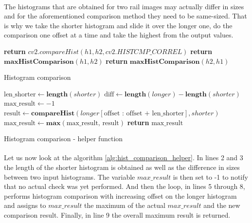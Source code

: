 \paragraph{}
The histograms that are obtained for two rail images may actually differ in sizes and for the aforementioned comparison method they need to be same-sized. That is why we take the shorter histogram and slide it over the longer one, do the comparison one offset at a time and take the highest from the output values.

\begin{algorithm}
	\begin{spacing}{1.5}
	\begin{algorithmic}[1]
				\State \textbf{return} $cv2.compareHist(h1, h2, cv2.HISTCMP\_CORREL)$
				\State \textbf{return} $\textbf{maxHistComparison}(h1, h2)$
			\Else
				\State \textbf{return} $\textbf{maxHistComparison}(h2, h1)$
			\EndIf
		\EndFunction
	\end{algorithmic}
	\end{spacing}
	\caption{Histogram comparison}
	\label{alg:hist_comparison}
\end{algorithm}

\begin{algorithm}
	\begin{spacing}{1.5}
	\begin{algorithmic}[1]
			\State $\text{len\_shorter} \gets \textbf{length}(shorter)$
			\State $\text{diff} \gets \textbf{length}(longer) - \textbf{length}(shorter)$
			\State $\text{max\_result} \gets -1$
				\State $\text{result} \gets \textbf{compareHist}(longer[\text{offset : offset + len\_shorter}], shorter)$
				\State $\text{max\_result} \gets \textbf{max}(\text{max\_result, result})$
			\EndFor
			\State \textbf{return} $\text{max\_result}$
		\EndFunction
	\end{algorithmic}
	\end{spacing}
	\caption{Histogram comparison - helper function}
	\label{alg:hist_comparison_helper}
\end{algorithm}

\paragraph{}
Let us now look at the algorithm \ref{alg:hist_comparison_helper}. In lines 2 and 3 the length of the shorter histogram is obtained as well as the difference in sizes between two input histograms. The variable $max\_result$ is then set to -1 to notify that no actual check was yet performed. And then the loop, in lines 5 through 8, performs histogram comparison with increasing offset on the longer histogram and assigns to $max\_result$ the maximum of the actual $max\_result$ and the new comparison result. Finally, in line 9 the overall maximum result is returned.

